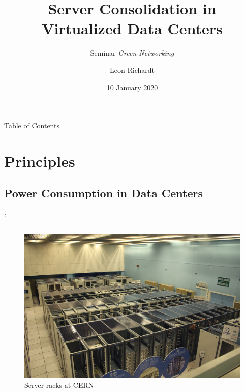 \documentclass[aspectratio=169]{beamer}
\title{Server Consolidation in \\ Virtualized Data Centers}
\subtitle{Seminar \textit{Green Networking}}
\author[L.~Richardt]{Leon Richardt}
\date[2020-01-10]{10 January 2020}
\institute{Osnabrück University}
\begin{document}
\begin{frame}
    \titlepage
\end{frame}

\begin{frame}{Table of Contents}
    \tableofcontents
\end{frame}

\section{Principles}
\subsection{Power Consumption in Data Centers}


\begin{frame}{\insertsectionhead: \insertsubsectionhead}
    \begin{columns}
        \begin{column}{0.5\paperwidth}
            \begin{figure}
                \includegraphics[width = 0.8\columnwidth, keepaspectratio]{cern_data_center}
                \caption{Server racks at CERN \cite{cern_data_center}}
            \end{figure}
        \end{column}


\end{columns}
\end{frame}
\end{document}

